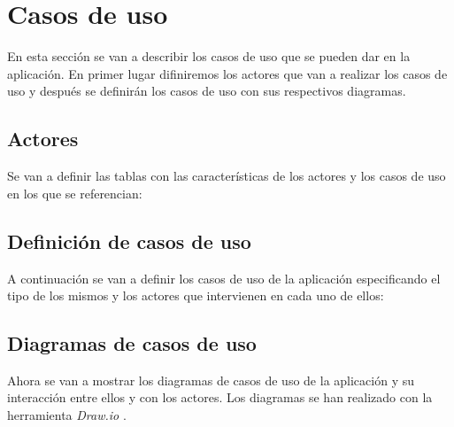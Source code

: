 

\section{Casos de uso}
En esta sección se van a describir los casos de uso que se pueden dar
en la aplicación. En primer lugar difiniremos los actores que van a realizar
los casos de uso y después se definirán los casos de uso con sus respectivos
diagramas.

\subsection{Actores}
Se van a definir las tablas con las características de los actores y los casos
de uso en los que se referencian:



\subsection{Definición de casos de uso}
A continuación se van a definir los casos de uso de la aplicación especificando
el tipo de los mismos y los actores que intervienen en cada uno de ellos:



\newpage
\subsection{Diagramas de casos de uso}
Ahora se van a mostrar los diagramas de casos de uso de la aplicación y su interacción
entre ellos y con los actores. Los diagramas se han realizado con la herramienta
\textit{Draw.io} \cite{drawio}.

